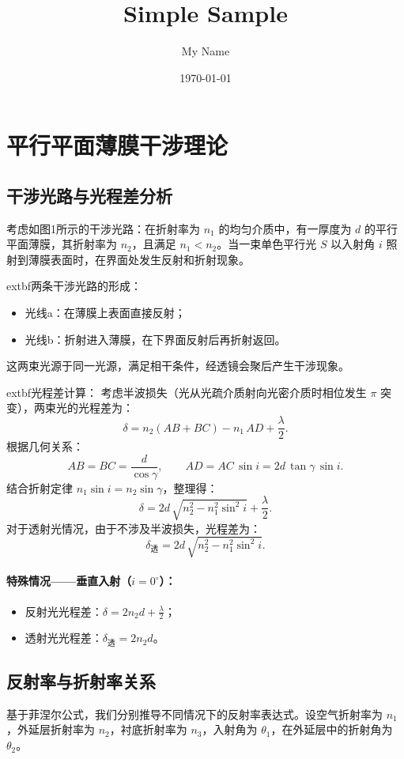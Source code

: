 \documentclass{ctexart} %
\title{Simple Sample} %
\author{My Name} %
\date{\today} %
\begin{document}
\maketitle %

\section{平行平面薄膜干涉理论}
\subsection{干涉光路与光程差分析}
考虑如图1所示的干涉光路：在折射率为 \(n_1\) 的均匀介质中，有一厚度为 \(d\) 的平行平面薄膜，其折射率为 \(n_2\)，且满足 \(n_1 < n_2\)。当一束单色平行光 \(S\) 以入射角 \(i\) 照射到薄膜表面时，在界面处发生反射和折射现象。

extbf{两条干涉光路的形成：}
\begin{itemize}
    \item 光线a：在薄膜上表面直接反射；
    \item 光线b：折射进入薄膜，在下界面反射后再折射返回。
\end{itemize}

这两束光源于同一光源，满足相干条件，经透镜会聚后产生干涉现象。

extbf{光程差计算：}
考虑半波损失（光从光疏介质射向光密介质时相位发生 \(\pi\) 突变），两束光的光程差为：
\[
    \delta = n_2(AB + BC) - n_1\, AD + \frac{\lambda}{2}.
\]
根据几何关系：
\[
    AB = BC = \frac{d}{\cos\gamma},\qquad
    AD = AC\, \sin i = 2d\, \tan\gamma\, \sin i.
\]
结合折射定律 \(n_1 \sin i = n_2 \sin\gamma\)，整理得：
\[
    \delta = 2d\, \sqrt{n_2^2 - n_1^2 \sin^2 i} + \frac{\lambda}{2}.
\]
对于透射光情况，由于不涉及半波损失，光程差为：
\[
    \delta_{\text{透}} = 2d\, \sqrt{n_2^2 - n_1^2 \sin^2 i}.
\]

\paragraph{特殊情况——垂直入射（\(i = 0^\circ\)）：}
\begin{itemize}
    \item 反射光光程差：\(\delta = 2n_2 d + \tfrac{\lambda}{2}\)；
    \item 透射光光程差：\(\delta_{\text{透}} = 2n_2 d\)。
\end{itemize}

\subsection{反射率与折射率关系}
基于菲涅尔公式，我们分别推导不同情况下的反射率表达式。设空气折射率为 \(n_1\)，外延层折射率为 \(n_2\)，衬底折射率为 \(n_3\)，入射角为 \(\theta_1\)，在外延层中的折射角为 \(\theta_2\)。
\end{document}
